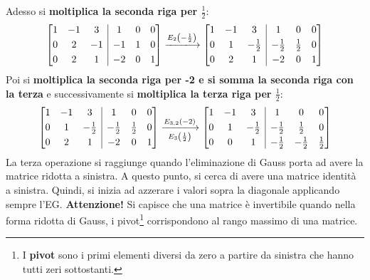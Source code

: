 \documentclass[a4paper]{article}
\makeatletter
\newenvironment{rowequmatbra}[1]{\left[\array{@{}#1@{}}}{\endarray\right]}
\makeatother
\begin{document}
	Adesso si \textbf{moltiplica la seconda riga per $\frac{1}{2}$}:
	\begin{equation*}
		\begin{rowequmatbra}{ccc|ccc}
			1 & -1 &  3 &  1 & 0 & 0 \\[0.3em]
			0 &  2 & -1 & -1 & 1 & 0 \\[0.3em]
			0 &  2 &  1 & -2 & 0 & 1
		\end{rowequmatbra} \xlongrightarrow{E_{2}\left(-\frac{1}{2}\right)}
		\begin{rowequmatbra}{ccc|ccc}
			1 & -1 &  3 &  1 & 0 & 0 \\[0.3em]
			0 &  1 & -\frac{1}{2} & -\frac{1}{2} & \frac{1}{2} & 0 \\[0.3em]
			0 &  2 &  1 & -2 & 0 & 1
		\end{rowequmatbra}
	\end{equation*}
	Poi si \textbf{moltiplica la seconda riga per -2 e si somma la seconda riga con la terza} e successivamente si \textbf{moltiplica la terza riga per $\frac{1}{2}$}:
	\begin{equation*}
		\begin{rowequmatbra}{ccc|ccc}
			1 & -1 &  3 &  1 & 0 & 0 \\[0.3em]
			0 &  1 & -\frac{1}{2} & -\frac{1}{2} & \frac{1}{2} & 0 \\[0.3em]
			0 &  2 &  1 & -2 & 0 & 1
		\end{rowequmatbra} \xlongrightarrow[E_{3}\left(\frac{1}{2}\right)]{E_{3,2}\left(-2\right)}
		\begin{rowequmatbra}{ccc|ccc}
			1 & -1 &  3 &  1 & 0 & 0 \\[0.3em]
			0 &  1 & -\frac{1}{2} & -\frac{1}{2} & \frac{1}{2} & 0 \\[0.3em]
			0 &  0 &  1 & -\frac{1}{2} & -\frac{1}{2} & \frac{1}{2}
		\end{rowequmatbra}
	\end{equation*}
	La \textcolor{Red3}{terza operazione} si raggiunge quando l'eliminazione di Gauss porta ad avere la matrice ridotta a sinistra. A questo punto, si cerca di avere una matrice identità a sinistra. Quindi, si inizia ad azzerare i valori sopra la diagonale applicando sempre l'EG.\newline
	\textbf{Attenzione!} Si capisce che una matrice è invertibile quando nella forma ridotta di Gauss, i pivot\footnote{I \textbf{pivot} sono i primi elementi diversi da zero a partire da sinistra che hanno tutti zeri sottostanti.} corrispondono al rango massimo di una matrice.
	
\end{document}
